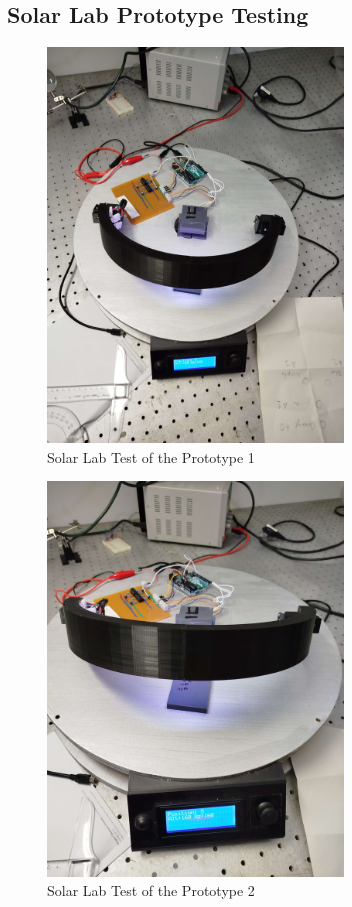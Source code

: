 \subsection{Solar Lab Prototype Testing}

\begin{figure}[htbp]
    \centering
    \includegraphics[width=0.7\textwidth]{figures/methodology/Prototype_testing/solarLab_test1.jpg}
    \caption{Solar Lab Test of the Prototype 1} 
    \label{fig:Solar-Lab-Test-Prototype1}
    \end{figure}

\begin{figure}[htbp]
        \centering
        \includegraphics[width=0.7\textwidth]{figures/methodology/Prototype_testing/solarLab_test2.jpg}
        \caption{Solar Lab Test of the Prototype 2} 
        \label{fig:Solar-Lab-Test-Prototype2}
        \end{figure}

